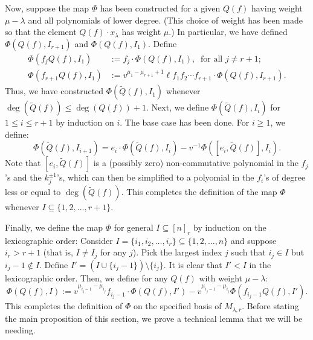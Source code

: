 \documentclass{amsart}
\numberwithin{equation}{section}
\theoremstyle{theorem}
\theoremstyle{definition}
\newcommand{\sub}{\subseteq}
\newcommand{\sm}{\setminus}
\begin{document}
Now, suppose the map $\Phi$ has been constructed for a given $Q(f)$ having weight $\mu-\lambda$ and all polynomials of lower degree. (This choice of weight has been made so that the element $Q(f)\cdot x_{\lambda}$ has weight $\mu$.) In particular, we have defined $\Phi(Q(f),I_{r+1})$ and $\Phi(Q(f),I_1)$. Define
\begin{align}\label{eq:Phi-fj}\Phi(f_jQ(f),I_1)&:=f_j\cdot \Phi(Q(f),I_1),~\text{ for all }j\neq r+1; \\
\label{eq:Phi-fr}\Phi(f_{r+1}Q(f),I_{1})&:=v^{\mu_1-\mu_{r+1}+1}\ell f_1f_2\cdots f_{r+1} \cdot \Phi(Q(f),I_{r+1}).\end{align}
Thus, we have constructed $\Phi(\widetilde Q(f),I_1)$ whenever $\deg(\widetilde{Q}(f))\leq \deg(Q(f))+1$. Next, we define $\Phi(\widetilde Q(f),I_i)$ for $1\leq i\leq r+1$ by induction on $i$. The base case has been done. For $i\geq 1$, we define:
\begin{equation}\label{eq:Phi-I+1}\Phi(\widetilde Q(f),I_{i+1})=e_i\cdot \Phi(\widetilde Q(f), I_i)-v^{-1}\Phi([e_i,\widetilde Q(f)], I_{i}).\end{equation}
Note that $[e_i,\widetilde{Q}(f)]$ is a (possibly zero) non-commutative polynomial in the $f_j$'s and the $k_j^{\pm1}$'s, which can then be simplified to a polyomial in the $f_i$'s of degree less or equal to $\deg (\widetilde{Q}(f))$. This completes the definition of the map $\Phi$ whenever $I\sub \{1,2,\dots, r+1\}$.

Finally, we define the map $\Phi$ for general $I\sub [n]_r$ by induction on the lexicographic order: Consider $I=\{i_1,i_2,\dots, i_r\} \sub \{1,2,\dots, n\}$ and suppose $i_r>r+1$ (that is, $I\neq I_j$ for any $j$). Pick the largest index $j$ such that $i_j\in I$ but $i_j-1\not\in I$. Define $I'=(I\cup\{i_j-1\})\sm\{i_j\}$. It is clear that $I'<I$ in the lexicographic order. Then, we define for any $Q(f)$ with weight $\mu-\lambda$: 
\begin{equation}\label{eq:Phi-I'}\Phi(Q(f),I):=v^{\mu_{i_j-1}-\mu_{i_j}}f_{i_j-1}\cdot \Phi(Q(f),I') - v^{\mu_{i_j-1}-\mu_{{i_j}}}\Phi(f_{i_j-1}Q(f), I').\end{equation}
 This completes the definition of $\Phi$ on the specified basis of $M_{\lambda,r}$. Before stating the main proposition of this section, we prove a technical lemma that we will be needing.
\end{document}
